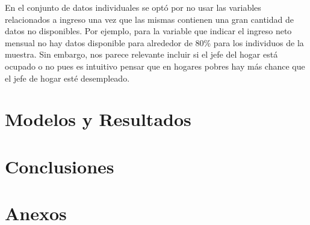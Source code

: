\documentclass[12pt,a4paper,onecolumn]{article}
\begin{document}
En el conjunto de datos individuales se optó por no usar las variables relacionados a ingreso una vez que las mismas contienen una gran cantidad de datos no disponibles. Por ejemplo, para la variable que indicar el ingreso neto mensual no hay datos disponible para alrededor de 80\% para los individuos de la muestra. Sin embargo, nos parece relevante incluir si el jefe del hogar está ocupado o no pues es intuitivo pensar que en hogares pobres hay más chance que el jefe de hogar esté desempleado.


\section{Modelos y Resultados}


\section{Conclusiones}

\section{Anexos}



\pagebreak
\singlespacing

\pagebreak
\end{document}
